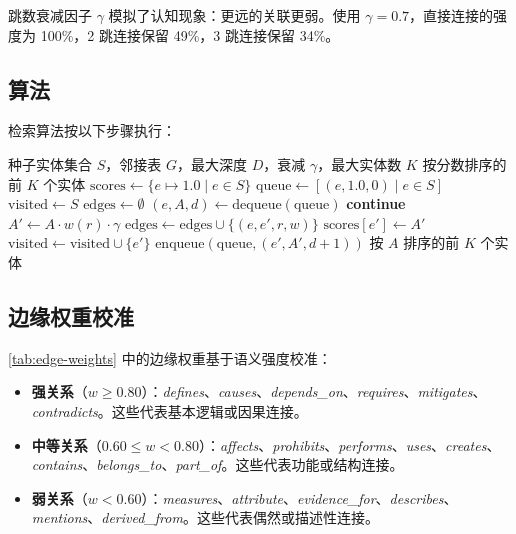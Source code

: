 \documentclass[11pt]{article}
\begin{document}
跳数衰减因子 $\gamma$ 模拟了认知现象：更远的关联更弱。使用 $\gamma = 0.7$，直接连接的强度为 100\%，2 跳连接保留 49\%，3 跳连接保留 34\%。

\subsection{算法}

检索算法按以下步骤执行：

\begin{algorithm}[htbp]
\caption{加权 BFS 检索}
\label{alg:retrieval}
\begin{algorithmic}[1]
\REQUIRE 种子实体集合 $S$，邻接表 $G$，最大深度 $D$，衰减 $\gamma$，最大实体数 $K$
\ENSURE 按分数排序的前 $K$ 个实体
\STATE $\text{scores} \gets \{e \mapsto 1.0 \mid e \in S\}$
\STATE $\text{queue} \gets [(e, 1.0, 0) \mid e \in S]$
\STATE $\text{visited} \gets S$
\STATE $\text{edges} \gets \emptyset$
    \STATE $(e, A, d) \gets \text{dequeue}(\text{queue})$
        \STATE \textbf{continue}
    \ENDIF
        \STATE $A' \gets A \cdot w(r) \cdot \gamma$
        \STATE $\text{edges} \gets \text{edges} \cup \{(e, e', r, w)\}$
            \STATE $\text{scores}[e'] \gets A'$
        \ENDIF
            \STATE $\text{visited} \gets \text{visited} \cup \{e'\}$
            \STATE $\text{enqueue}(\text{queue}, (e', A', d+1))$
        \ENDIF
    \ENDFOR
\ENDWHILE
\RETURN 按 $A$ 排序的前 $K$ 个实体
\end{algorithmic}
\end{algorithm}

\subsection{边缘权重校准}

\cref{tab:edge-weights} 中的边缘权重基于语义强度校准：

\begin{itemize}
    \item \textbf{强关系}（$w \geq 0.80$）：\textit{defines}、\textit{causes}、\textit{depends\_on}、\textit{requires}、\textit{mitigates}、\textit{contradicts}。这些代表基本逻辑或因果连接。
    \item \textbf{中等关系}（$0.60 \leq w < 0.80$）：\textit{affects}、\textit{prohibits}、\textit{performs}、\textit{uses}、\textit{creates}、\textit{contains}、\textit{belongs\_to}、\textit{part\_of}。这些代表功能或结构连接。
    \item \textbf{弱关系}（$w < 0.60$）：\textit{measures}、\textit{attribute}、\textit{evidence\_for}、\textit{describes}、\textit{mentions}、\textit{derived\_from}。这些代表偶然或描述性连接。
\end{itemize}
\end{document}

